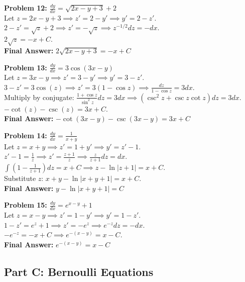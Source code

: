 \documentclass[12pt]{article}
\begin{document}
\vspace{10pt}
\textbf{Problem 12:} $\frac{dy}{dx} = \sqrt{2x - y + 3} + 2$ \\
Let $z = 2x-y+3 \implies z' = 2 - y' \implies y' = 2 - z'$. \\
$2 - z' = \sqrt{z} + 2 \implies z' = -\sqrt{z} \implies z^{-1/2} dz = -dx$. \\
$2\sqrt{z} = -x + C$. \\
\textbf{Final Answer:} $2\sqrt{2x-y+3} = -x + C$

\vspace{10pt}
\textbf{Problem 13:} $\frac{dy}{dx} = 3\cos(3x-y)$ \\
Let $z = 3x-y \implies z' = 3 - y' \implies y' = 3 - z'$. \\
$3 - z' = 3\cos(z) \implies z' = 3(1-\cos z) \implies \frac{dz}{1-\cos z} = 3dx$. \\
Multiply by conjugate: $\frac{1+\cos z}{\sin^2 z} dz = 3dx \implies (\csc^2 z + \csc z \cot z)dz = 3dx$. \\
$-\cot(z) - \csc(z) = 3x + C$. \\
\textbf{Final Answer:} $-\cot(3x-y) - \csc(3x-y) = 3x + C$

\vspace{10pt}
\textbf{Problem 14:} $\frac{dy}{dx} = \frac{1}{x+y}$ \\
Let $z = x+y \implies z' = 1+y' \implies y' = z'-1$. \\
$z' - 1 = \frac{1}{z} \implies z' = \frac{z+1}{z} \implies \frac{z}{z+1} dz = dx$. \\
$\int \left(1 - \frac{1}{z+1}\right)dz = x + C \implies z - \ln|z+1| = x + C$. \\
Substitute $z$: $x+y - \ln|x+y+1| = x + C$. \\
\textbf{Final Answer:} $y - \ln|x+y+1| = C$

\vspace{10pt}
\textbf{Problem 15:} $\frac{dy}{dx} = e^{x-y} + 1$ \\
Let $z = x-y \implies z' = 1 - y' \implies y' = 1 - z'$. \\
$1 - z' = e^z + 1 \implies z' = -e^z \implies e^{-z} dz = -dx$. \\
$-e^{-z} = -x + C \implies e^{-(x-y)} = x - C$. \\
\textbf{Final Answer:} $e^{-(x-y)} = x - C$

\subsection*{Part C: Bernoulli Equations}
\end{document}
